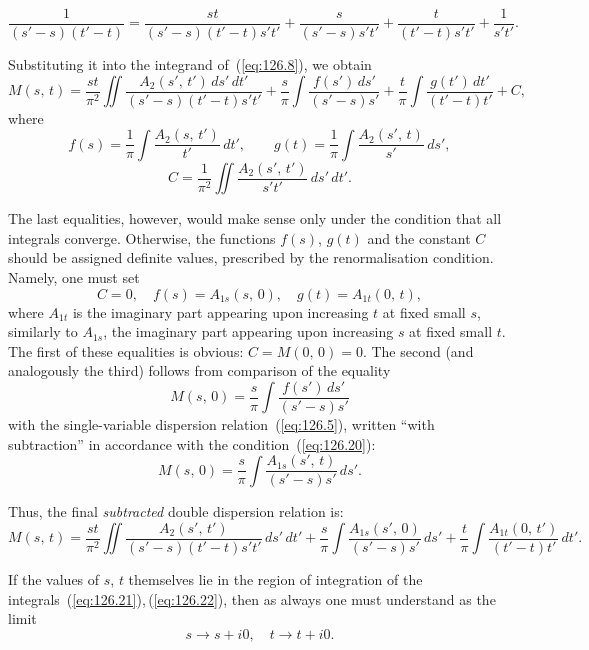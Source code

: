
\[
\frac{1}{(s'-s)(t'-t)} = \frac{st}{(s'-s)(t'-t)s't'} + \frac{s}{(s'-s)s't'} + \frac{t}{(t'-t)s't'} + \frac{1}{s't'}.
\]

Substituting it into the integrand of~(\ref{eq:126.8}), we obtain
\[
M(s,\,t) = \frac{st}{\pi^2}\iint \frac{A_2(s',\,t')\,ds'\,dt'}{(s'-s)(t'-t)s't'} + \frac{s}{\pi}\int \frac{f(s')\,ds'}{(s'-s)s'} + \frac{t}{\pi}\int \frac{g(t')\,dt'}{(t'-t)t'} + C,
\]
where
\[
f(s) = \frac{1}{\pi}\int \frac{A_2(s,\,t')}{t'}\,dt',\qquad g(t) = \frac{1}{\pi}\int \frac{A_2(s',\,t)}{s'}\,ds',
\]
\[
C = \frac{1}{\pi^2}\iint \frac{A_2(s',\,t')}{s't'}\,ds'\,dt'.
\]

The last equalities, however, would make sense only under the condition that all integrals converge. Otherwise, the functions $f(s)$, $g(t)$ and the constant $C$ should be assigned definite values, prescribed by the renormalisation condition. Namely, one must set
\[
C = 0,\quad f(s) = A_{1s}(s,\,0),\quad g(t) = A_{1t}(0,\,t),
\]
where $A_{1t}$ is the imaginary part appearing upon increasing $t$ at fixed small $s$, similarly to $A_{1s}$, the imaginary part appearing upon increasing $s$ at fixed small $t$. The first of these equalities is obvious: $C = M(0,\,0) = 0$. The second (and analogously the third) follows from comparison of the equality
\[
M(s,\,0) = \frac{s}{\pi}\int \frac{f(s')\,ds'}{(s'-s)s'}
\]
with the single-variable dispersion relation~(\ref{eq:126.5}), written ``with subtraction'' in accordance with the condition~(\ref{eq:126.20}):
\begin{equation}
M(s,\,0) = \frac{s}{\pi}\int \frac{A_{1s}(s',\,t)}{(s'-s)s'}\,ds'.
\label{eq:126.21}
\end{equation}

Thus, the final \emph{subtracted} double dispersion relation is:
\begin{equation}
M(s,\,t) = \frac{st}{\pi^2}\iint \frac{A_2(s',\,t')}{(s'-s)(t'-t)s't'}\,ds'\,dt' + \frac{s}{\pi}\int \frac{A_{1s}(s',\,0)}{(s'-s)s'}\,ds' + \frac{t}{\pi}\int \frac{A_{1t}(0,\,t')}{(t'-t)t'}\,dt'.
\label{eq:126.22}
\end{equation}

If the values of $s$, $t$ themselves lie in the region of integration of the integrals~(\ref{eq:126.21}),\,(\ref{eq:126.22}), then as always one must understand as the limit
\begin{equation}
s \to s + i0,\quad t \to t + i0.
\label{eq:126.23}
\end{equation}
